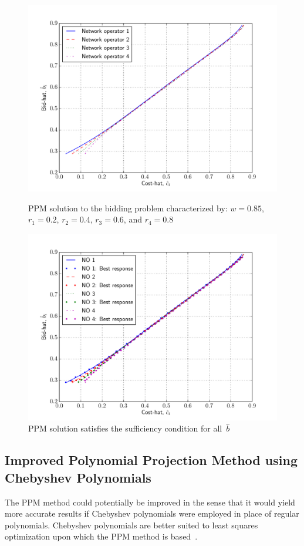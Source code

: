 \begin{figure}[p!]
  \includegraphics[width=\figsize]{Indirect/Figures/polynomial_projection_4}
  \caption{PPM solution to the bidding problem characterized by: $w=0.85$, $r_1 = 0.2$, $r_2 = 0.4$, $r_3 = 0.6$, and $r_4=0.8$}
  \label{fig:polynomial_projection_4_indirect}
  \vspace{10mm}
  \includegraphics[width=\figsize]{Indirect/Figures/polynomial_projection_4_sufficiency}
  \caption{PPM solution satisfies the sufficiency condition for all~$\hat{b}$}
  \label{fig:polynomial_projection_4_sufficiency_indirect}
\end{figure}

\subsection{Improved Polynomial Projection Method using Chebyshev Polynomials} %
\label{sub:improved_polynomial_projection_method_using_chebyshev_polynomials_indirect}
The PPM method could potentially be improved in the sense that it would yield more accurate results if Chebyshev polynomials were employed in place of regular polynomials. Chebyshev polynomials are better suited to least squares optimization upon which the PPM method is based~\cite{MasonApproximation2003,Hubbard2011}.

